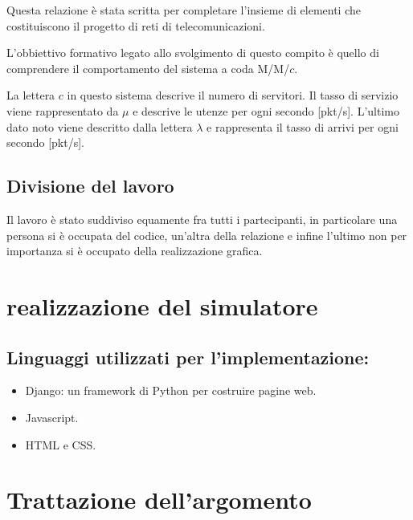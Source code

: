 \documentclass[12pt,a4paper]{article}
\begin{document}
    Questa relazione è stata scritta per completare l'insieme di elementi che costituiscono il progetto di reti di telecomunicazioni.
    
    L'obbiettivo formativo legato allo svolgimento di questo compito è quello di comprendere il comportamento del sistema a coda M/M/$c$.

    La lettera $c$ in questo sistema descrive il numero di servitori. Il tasso di servizio viene rappresentato da $\mu$ e descrive le utenze per ogni secondo [pkt/s]. L'ultimo dato noto viene descritto dalla lettera $\lambda$ e rappresenta il tasso di arrivi per ogni secondo [pkt/s].

\subsection{Divisione del lavoro}
    Il lavoro è stato suddiviso equamente fra tutti i partecipanti, in particolare una persona si è occupata del codice, un'altra della relazione e infine l'ultimo non per importanza si è occupato della realizzazione grafica.
\section{realizzazione del simulatore}
    \subsection{Linguaggi utilizzati per l'implementazione:}
    \begin{itemize}
        \item Django: un framework di Python per costruire pagine web.
        \item Javascript.
        \item HTML e CSS.
    \end{itemize}
\section{Trattazione dell'argomento}
\newpage
\end{document}
